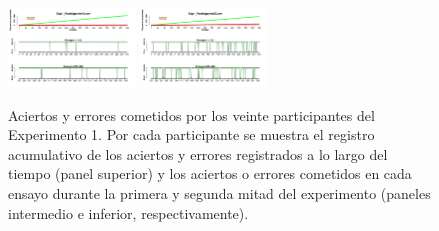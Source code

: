 \documentclass[a4paper ]{article}
\begin{document}
\begin{figure}[th]
\includegraphics[width=0.3\textwidth]{Figures/Success_Exp1_P19} \includegraphics[width=0.3\textwidth]{Figures/Success_Exp1_P20} 
\caption[Aciertos y Errores a lo largo del tiempo; Experimento 1]{Aciertos y errores cometidos por los veinte participantes del Experimento 1. Por cada participante se muestra el registro acumulativo de los aciertos y errores registrados a lo largo del tiempo (panel superior) y los aciertos o errores cometidos en cada ensayo durante la primera y segunda mitad del experimento (paneles intermedio e inferior, respectivamente).}
\label{fig:Success_E1}
\end{figure}
\end{document}

